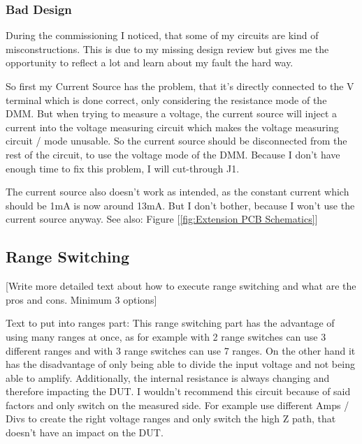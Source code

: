 \newpage

\subsubsection{Bad Design}
\label{sssec:baddesign}
During the commissioning I noticed, that some of my circuits are kind of misconstructions. This is due to my missing design review but gives me the opportunity to reflect a lot and learn about my fault the hard way.

So first my Current Source has the problem, that it's directly connected to the V terminal which is done correct, only considering the resistance mode of the DMM. But when trying to measure a voltage, the current source will inject a current into the voltage measuring circuit which makes the voltage measuring circuit / mode unusable. So the current source should be disconnected from the rest of the circuit, to use the voltage mode of the DMM. Because I don't have enough time to fix this problem, I will cut-through J1.

The current source also doesn't work as intended, as the constant current which should be 1mA is now around 13mA. But I don't bother, because I won't use the current source anyway.
See also: Figure [\ref{fig:Extension PCB Schematics}]

\subsection{Range Switching}
\label{subsec:rangeswitching}
[Write more detailed text about how to execute range switching and what are the pros and cons. Minimum 3 options]


Text to put into ranges part:
This range switching part has the advantage of using many ranges at once, as for example with 2 range switches can use 3 different ranges and with 3 range switches can use 7 ranges. On the other hand it has the disadvantage of only being able to divide the input voltage and not being able to amplify. Additionally, the internal resistance is always changing and therefore impacting the DUT. I wouldn't recommend this circuit because of said factors and only switch on the measured side. For example use different Amps / Divs to create the right voltage ranges and only switch the high Z path, that doesn't have an impact on the DUT.





\newpage
